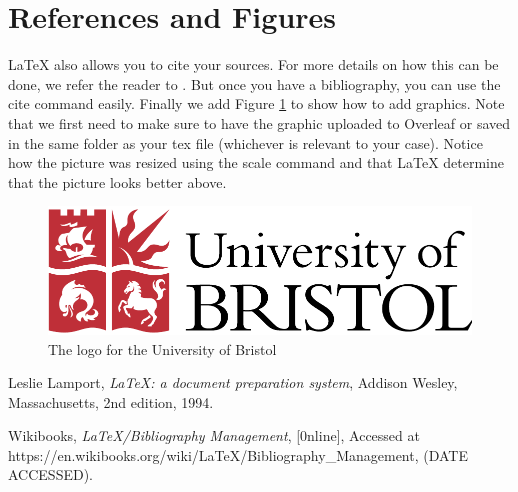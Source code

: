 \documentclass[a4paper,11pt]{article}
\theoremstyle{definition}
\begin{document}
\section{References and Figures}
\LaTeX{} \cite{lamport94} also allows you to cite your sources. For more details on how this can be done, we refer the reader to \cite[sec:~Embedded System]{referencing}. But once you have a bibliography, you can use the cite command easily. Finally we add Figure \ref{fig:logo} to show how to add graphics. Note that we first need to make sure to have the graphic uploaded to Overleaf  or saved in the same folder as your tex file (whichever is relevant to your case). Notice how the picture was resized using the scale command and that \LaTeX{} determine that the picture looks better above.

\begin{figure}
    \centering
    \includegraphics[scale=0.6]{uob.pdf}
    \caption{The logo for the University of Bristol}
    \label{fig:logo}
\end{figure}


\begin{thebibliography}{99}

  Leslie Lamport,
  \textit{\LaTeX: a document preparation system},
  Addison Wesley, Massachusetts,
  2nd edition,
  1994.
  
    Wikibooks,
    \textit{\LaTeX/Bibliography Management},
    [0nline],
    Accessed at https://en.wikibooks.org/wiki/LaTeX/Bibliography\_Management,
    (DATE ACCESSED).
    

\end{thebibliography}
\end{document}
